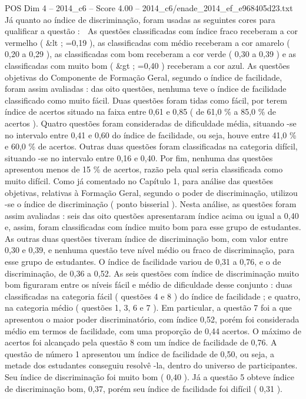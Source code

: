 \begin{textsample}{POS Dim 4 – 2014\_c6 – Score 4.00 – 2014\_c6/enade\_2014\_ef\_e968405d23.txt}
Já quanto ao índice de discriminação, foram usadas as seguintes cores para qualificar a questão :  As questões classificadas com índice fraco receberam a cor vermelho ( \&lt ; =0,19 ), as classificadas com médio receberam a cor amarelo ( 0,20 a 0,29 ), as classificadas com bom receberam a cor verde ( 0,30 a 0,39 ) e as classificadas com muito bom ( \&gt ; =0,40 ) receberam a cor azul.
As questões objetivas do Componente de Formação Geral, segundo o índice de facilidade, foram assim avaliadas : das oito questões, nenhuma teve o índice de facilidade classificado como muito fácil.
Duas questões foram tidas como fácil, por terem índice de acertos situado na faixa entre 0,61 e 0,85 ( de 61,0 \% a 85,0 \% de acertos ).
Quatro questões foram consideradas de dificuldade média, situando -se no intervalo entre 0,41 e 0,60 do índice de facilidade, ou seja, houve entre 41,0 \% e 60,0 \% de acertos.
Outras duas questões foram classificadas na categoria difícil, situando -se no intervalo entre 0,16 e 0,40.
Por fim, nenhuma das questões apresentou menos de 15 \% de acertos, razão pela qual seria classificada como muito difícil.
Como já comentado no Capítulo 1, para análise das questões objetivas, relativas à Formação Geral, segundo o poder de discriminação, utilizou -se o índice de discriminação ( ponto bisserial ).
Nesta análise, as questões foram assim avaliadas : seis das oito questões apresentaram índice acima ou igual a 0,40 e, assim, foram classificadas com índice muito bom para esse grupo de estudantes.
As outras duas questões tiveram índice de discriminação bom, com valor entre 0,30 e 0,39, e nenhuma questão teve nível médio ou fraco de discriminação, para esse grupo de estudantes.
O índice de facilidade variou de 0,31 a 0,76, e o de discriminação, de 0,36 a 0,52.
As seis questões com índice de discriminação muito bom figuraram entre os níveis fácil e médio de dificuldade desse conjunto : duas classificadas na categoria fácil ( questões 4 e 8 ) do índice de facilidade ; e quatro, na categoria médio ( questões 1, 3, 6 e 7 ).
Em particular, a questão 7 foi a que apresentou o maior poder discriminatório, com índice 0,52, porém foi considerada médio em termos de facilidade, com uma proporção de 0,44 acertos.
O máximo de acertos foi alcançado pela questão 8 com um índice de facilidade de 0,76.
A questão de número 1 apresentou um índice de facilidade de 0,50, ou seja, a metade dos estudantes conseguiu resolvê -la, dentro do universo de participantes.
Seu índice de discriminação foi muito bom ( 0,40 ).
Já a questão 5 obteve índice de discriminação bom, 0,37, porém seu índice de facilidade foi difícil ( 0,31 ).

\end{textsample}
